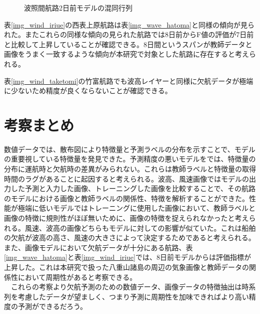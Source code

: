 \begin{figure}[H]
\begin{minipage}{0.5\hsize}
\begin{center}
  \end{center}
   \caption{波照間航路2日前モデルの混同行列}
 \label{wind_hateruma_2_conf}
 \end{minipage}
\end{figure}

表\ref{img_wind_iriue}の西表上原航路は表\ref{img_wave_hatoma}と同様の傾向が見られた。またこれらの同様な傾向の見られた航路では8日前からF値の評価が7日前と比較して上昇していることが確認できる。8日間というスパンが教師データと画像をうまく一致するような傾向が本研究で対象とした航路に存在すると考えられる。

表\ref{img_wind_taketomi}の竹富航路でも波高レイヤーと同様に欠航データが極端に少ないため精度が良くならないことが確認できる。

\section{考察まとめ}
数値データでは、散布図により特徴量と予測ラベルの分布を示すことで、モデルの重要視している特徴量を発見できた。予測精度の悪いモデルをでは、特徴量の分布に運航時と欠航時の差異がみられない。これらは教師ラベルと特徴量の取得時間のラグがあることに起因すると考えられる。波高、風速画像ではモデルの出力した予測と入力した画像、トレーニングした画像を比較することで、その航路のモデルにおける画像と教師ラベルの関係性、特徴を解析することができた。性能が極端に低いモデルではトレーニングに使用した画像において、教師ラベルと画像の特徴に規則性がほぼ無いために、画像の特徴を捉えられなかったと考えられる。風速、波高の画像どちらもモデルに対しての影響が似ていた。これは船舶の欠航が波高の高さ、風速の大きさによって決定するためであると考えられる。また、画像モデルにおいて欠航データが十分にある航路、表\ref{img_wave_hatoma}と表\ref{img_wind_iriue}では、8日前モデルからは評価指標が上昇した。これは本研究で扱った八重山諸島の周辺の気象画像と教師データの関係性において周期性があると考察できる。
\\　これらの考察より欠航予測のための数値データ、画像データの特徴抽出は時系列を考慮したデータが望ましく、つまり予測に周期性を加味できればより高い精度の予測ができるだろう。



